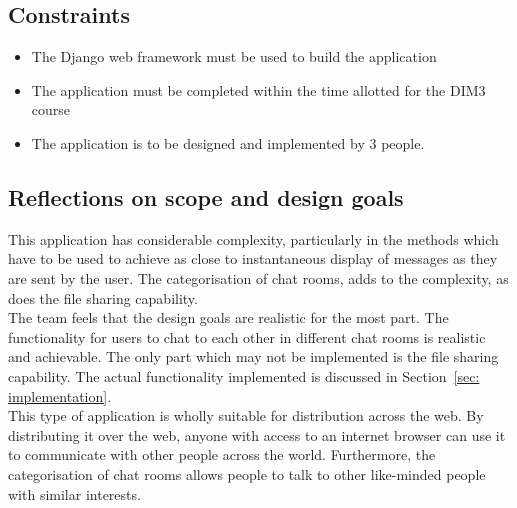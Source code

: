 \documentclass{sig-alt-release2}
\begin{document}
\subsection{Constraints}
\label{sec: constraints} 
\begin{itemize} 
\item The Django web framework must be used to build the application
\item The application must be completed within the time allotted for the DIM3 course
\item The application is to be designed and implemented by 3 people.
\end{itemize}

\subsection{Reflections on scope and design goals}
This application has considerable complexity, particularly in the methods which have to be used to achieve as close to instantaneous display of messages as they are sent by the user. The categorisation of chat rooms, adds to the complexity, as does the file sharing capability. \\

The team feels that the design goals are realistic for the most part. The functionality for users to chat to each other in different chat rooms is realistic and achievable. The only part which may not be implemented is the file sharing capability. The actual functionality implemented is discussed in Section~\ref{sec: implementation}. \\

This type of application is wholly suitable for distribution across the web. By distributing it over the web, anyone with access to an internet browser can use it to communicate with other people across the world. Furthermore, the categorisation of chat rooms allows people to talk to other like-minded people with similar interests. \\
\end{document}

